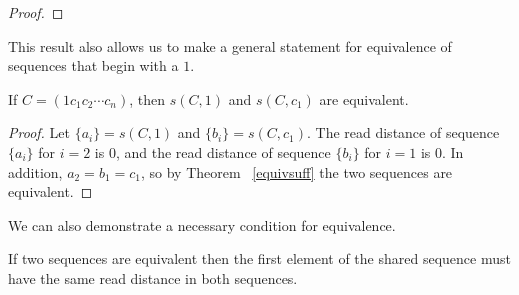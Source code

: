 \documentclass[runningheads,a4paper]{llncs}
\begin{document}
\begin{proof}




\end{proof}

This result also allows us to make a general statement for equivalence of sequences that begin with a $1$.
\begin{corollary} If $C = (1 c_1 c_2 \cdots c_n)$, then $s(C, 1)$ and $s(C, c_1)$ are equivalent.
\end{corollary}
\begin{proof}
Let $\{a_i\} = s(C, 1)$ and $\{b_i\} = s(C, c_1)$. The read distance of sequence $\{a_i\}$ for $i=2$ is 0, and the read distance of sequence $\{b_i\}$ for $i = 1$ is 0. In addition, $a_2 = b_1 = c_1$, so by Theorem ~\ref{equivsuff} the two sequences are equivalent.
\end{proof}

We can also demonstrate a necessary condition for equivalence. 
\begin{theorem}
\label{thm:readfirst}
If two sequences are equivalent then the first element of the shared sequence must have the same read distance in both sequences.
\end{theorem}
\end{document}
